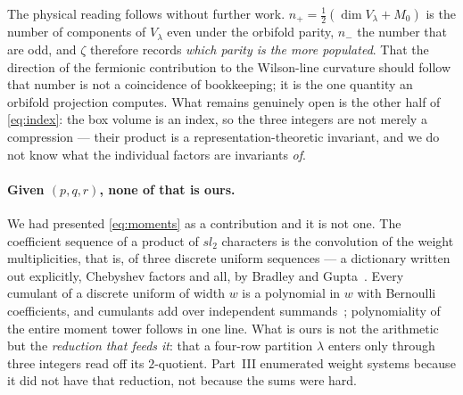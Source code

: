 \documentclass[11pt,a4paper]{article}
\begin{document}
The physical reading follows without further work. $n_+=\tfrac12(\dim V_\lambda+M_0)$ is the number
of components of $V_\lambda$ even under the orbifold parity, $n_-$ the number that are odd, and
$\zeta$ therefore records \emph{which parity is the more populated}. That the direction of the
fermionic contribution to the Wilson-line curvature should follow that number is not a coincidence
of bookkeeping; it is the one quantity an orbifold projection computes. What remains genuinely open
is the other half of \eqref{eq:index}: the box volume is an index, so the three integers are not
merely a compression --- their product is a representation-theoretic invariant, and we do not know
what the individual factors are invariants \emph{of}.

\paragraph{Given $(p,q,r)$, none of that is ours.} We had presented \eqref{eq:moments} as a
contribution and it is not one. The coefficient sequence of a product of $sl_2$ characters is
the convolution of the weight multiplicities, that is, of three discrete uniform sequences ---
a dictionary written out explicitly, Chebyshev factors and all, by Bradley and
Gupta~\cite{BradleyGupta}. Every cumulant of a discrete uniform of width $w$ is a polynomial in
$w$ with Bernoulli coefficients, and cumulants add over independent summands~\cite{Neuschel};
polynomiality of the entire moment tower follows in one line. What is ours is not the arithmetic
but the \emph{reduction that feeds it}: that a four-row partition $\lambda$ enters only through
three integers read off its $2$-quotient. Part~III enumerated weight systems because it did not
have that reduction, not because the sums were hard.
\end{document}
